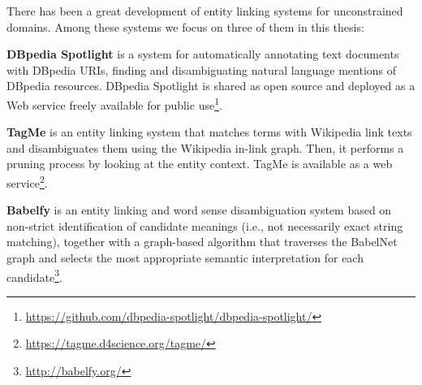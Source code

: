 There has been a great development of entity linking systems for unconstrained domains. Among these systems we focus on three of them in this thesis:

\noindent \textbf{DBpedia Spotlight} \citep{Mendes2011} is a system for automatically annotating text documents with DBpedia URIs, finding and disambiguating natural language mentions of DBpedia resources. DBpedia Spotlight is shared as open source and deployed as a Web service freely available for public use\footnote{\url{https://github.com/dbpedia-spotlight/dbpedia-spotlight/}}.

\noindent \textbf{TagMe} \citep{Ferragina2012} is an entity linking system that matches terms with Wikipedia link texts and disambiguates them using the Wikipedia in-link graph. Then, it performs a pruning process by looking at the entity context. TagMe is available as a web service\footnote{\url{https://tagme.d4science.org/tagme/}}.

\noindent \textbf{Babelfy} \citep{Moroetal2014b} is an entity linking and word sense disambiguation system based on non-strict identification of candidate meanings (i.e., not necessarily exact string matching), together with a graph-based algorithm that traverses the BabelNet graph and selects the most appropriate semantic interpretation for each candidate\footnote{\url{http://babelfy.org/}}.

